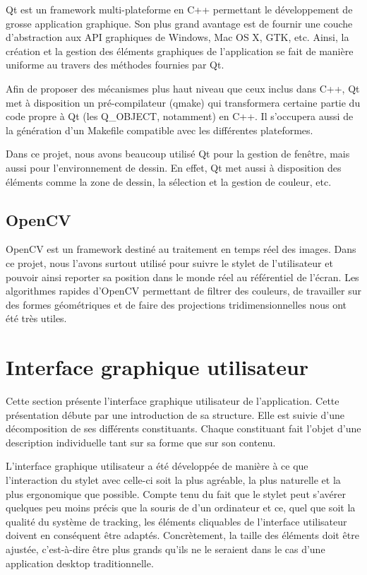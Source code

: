 \documentclass[11pt,a4paper,oldfontcommands]{memoir}
\begin{document}
Qt est un framework multi-plateforme en C++ permettant le développement de grosse application graphique. Son plus grand avantage est de fournir une couche d'abstraction aux API graphiques de Windows, Mac OS X, GTK, etc. Ainsi, la création et la gestion des éléments graphiques de l'application se fait de manière uniforme au travers des méthodes fournies par Qt.

Afin de proposer des mécanismes plus haut niveau que ceux inclus dans C++, Qt met à disposition un pré-compilateur (qmake) qui transformera certaine partie du code propre à Qt (les Q\_OBJECT, notamment) en C++. Il s'occupera aussi de la génération d'un Makefile compatible avec les différentes plateformes.

Dans ce projet, nous avons beaucoup utilisé Qt pour la gestion de fenêtre, mais aussi pour l'environnement de dessin. En effet, Qt met aussi à disposition des éléments comme la zone de dessin, la sélection et la gestion de couleur, etc.

\subsection{OpenCV}

OpenCV est un framework destiné au traitement en temps réel des images. Dans ce projet, nous l'avons surtout utilisé pour suivre le stylet de l'utilisateur et pouvoir ainsi reporter sa position dans le monde réel au référentiel de l'écran. Les algorithmes rapides d'OpenCV permettant de filtrer des couleurs, de travailler sur des formes géométriques et de faire des projections tridimensionnelles nous ont été très utiles.

\newpage

\section{Interface graphique utilisateur}

Cette section présente l'interface graphique utilisateur de l'application. Cette présentation débute par une introduction de sa structure. Elle est suivie d'une décomposition de ses différents constituants. Chaque constituant fait l'objet d'une description individuelle tant sur sa forme que sur son contenu.

L'interface graphique utilisateur a été développée de manière à ce que l'interaction du stylet avec celle-ci soit la plus agréable, la plus naturelle et la plus ergonomique que possible. Compte tenu du fait que le stylet peut s'avérer quelques peu moins précis que la souris de d'un ordinateur et ce, quel que soit la qualité du système de tracking, les éléments cliquables de l'interface utilisateur doivent en conséquent être adaptés. Concrètement, la taille des éléments doit être ajustée, c'est-à-dire être plus grands qu'ils ne le seraient dans le cas d'une application desktop traditionnelle.
\end{document}
